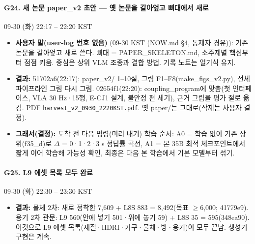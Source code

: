 \paragraph{G24. 새 논문 paper\_v2 초안 --- 옛 논문을 갈아엎고 뼈대에서 새로}
{\small 09-30 (화) 22:17 -- 22:20 KST}
\begin{itemize}
  \item \textbf{사용자 말(user-log 번호 없음)} (09-30 KST (NOW.md §4, 통제자 경유)): 기존 논문을 갈아엎고 새로 쓴다. 뼈대 = PAPER\_SKELETON.md, 소주제별 핵심부터 점점 키움. 중심은 상위 VLM 조종과 결합 방법. 기록 노트는 일기식 유지.
  \item \textbf{결과:} 51702a6(22:17): paper\_v2/ 1--10절, 그림 F1--F8(make\_figs\_v2.py), 전체 파이프라인 그림 다시 그림. 02654f1(22:20): coupling\_program에 맞춤(첫 인터페이스, VLA 30 Hz·15행, E-CJ1 설계, 불안정 편 세기), 근거 그림을 평가 절로 옮김. PDF \texttt{harvest\_\allowbreak{}v2\_\allowbreak{}0930\_\allowbreak{}2220KST.\allowbreak{}pdf}. 옛 paper/는 그대로(삭제는 사용자 결정).
  \item \textbf{그래서(결정):} 도착 전 다음 명령(미리 내기) 학습 순서: A0 = 학습 없이 기존 상위(f35\_d)로 $\Delta$ = 0·1·2·3 s 정답률 곡선, A1 = 본 35B 최적 체크포인트에서 짧게 이어 학습해 가능성 확인, 최종은 다음 본 학습에서 기본 모델부터 섞기.
\end{itemize}

\paragraph{G25. L9 에셋 목록 모두 완료}
{\small 09-30 (화) 22:30 -- 23:30 KST}
\begin{itemize}
  \item \textbf{결과:} 물체 2차: 새로 정착한 7,609 + L8S 883 = 8,492(목표 $\geq$6,000; 41779e9). 용기 2차 관문: L9 560(안에 넣기 501·위에 놓기 59) + L8S 35 = 595(348ea90). 이것으로 L9 에셋 목록(재질·HDRI·가구·물체·방·용기)이 모두 끝남. 생성기 구현은 계속.
\end{itemize}

